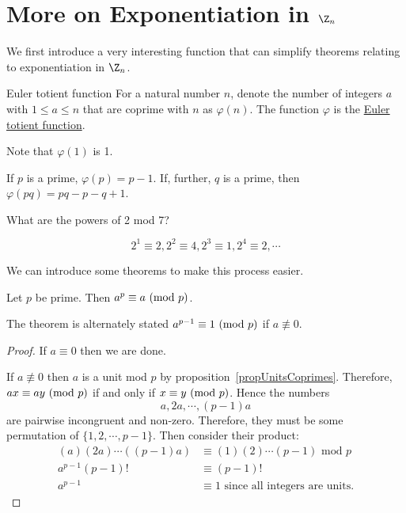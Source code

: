 \documentclass[../Main.tex]{subfiles}
\begin{document}
\section{More on Exponentiation in \texorpdfstring{$\Z_n$}{Zn}}
We first introduce a very interesting function that can simplify theorems relating to exponentiation in $\Z_n$.
\begin{definition}{Euler totient function}
    For a natural number $n$, denote the number of integers $a$ with $1 \leq a \leq n$ that are coprime with $n$ as $\varphi(n)$. The function $\varphi$ is the \underline{Euler totient function}.
\end{definition}
Note that $\varphi(1)$ is 1.\par
If $p$ is a prime, $\varphi(p) = p - 1$. If, further, $q$ is a prime, then $\varphi(pq) = pq - p - q + 1$.
\begin{example}
    What are the powers of 2 mod 7?\par
    \begin{equation*}
        2^1 \equiv 2, 2^2 \equiv 4, 2^3 \equiv 1, 2^4 \equiv 2, \cdots
    \end{equation*}
\end{example}
We can introduce some theorems to make this process easier.
\begin{theorem}
    Let $p$ be prime. Then $a^p \equiv a~(\text{mod}~{p})$.
    \label{thmFermatLittle}
\end{theorem}
The theorem is alternately stated $a^{p-1} \equiv 1~(\text{mod}~{p})$ if $a \not\equiv 0$.
\begin{proof}
    If $a \equiv 0$ then we are done.\par
    If $a \not\equiv 0$ then $a$ is a unit mod $p$ by proposition~\ref{propUnitsCoprimes}. Therefore, $ax \equiv ay~(\text{mod}~{p})$ if and only if $x \equiv y~(\text{mod}~{p})$. Hence the numbers
    \begin{equation*}
        a, 2a, \cdots, (p-1)a
    \end{equation*}
    are pairwise incongruent and non-zero. Therefore, they must be some permutation of $\{1, 2, \cdots, p-1\}$. Then consider their product:
    \begin{align*}
        (a)(2a)\cdots((p-1)a) &\equiv (1)(2)\cdots(p-1)\text{ mod } p \\
        a^{p-1}(p-1)! &\equiv (p-1)! \\
        a^{p-1} &\equiv 1 \text{ since all integers are units.}
    \end{align*}
\end{proof}
\end{document}
